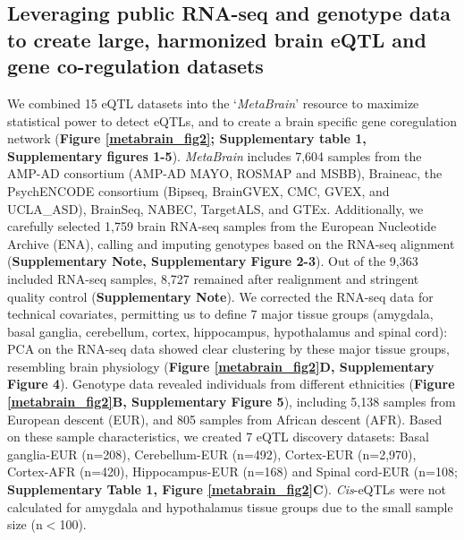 \subsection{Leveraging public RNA-seq and genotype data to create large, harmonized brain eQTL and gene co-regulation datasets}
We combined 15 eQTL datasets into the ‘\textit{MetaBrain}’ resource to maximize statistical power to detect eQTLs, and to create a brain specific gene coregulation network (\textbf{Figure \ref{metabrain_fig2}; Supplementary table 1, Supplementary figures 1-5}). \textit{MetaBrain} includes 7,604 samples from the AMP-AD consortium\cite{hodesAcceleratingMedicinesPartnership2016} (AMP-AD MAYO\cite{hodesAcceleratingMedicinesPartnership2016}, ROSMAP\cite{hodesAcceleratingMedicinesPartnership2016} and MSBB\cite{hodesAcceleratingMedicinesPartnership2016}), Braineac\cite{ramasamyGeneticVariabilityRegulation2014}, the PsychENCODE consortium\cite{consortium*RevealingBrainMolecular2018} (Bipseq\cite{wangComprehensiveFunctionalGenomic2018}, BrainGVEX\cite{wangComprehensiveFunctionalGenomic2018}, CMC\cite{fromerGeneExpressionElucidates2016}, GVEX, and UCLA\_ASD\cite{wangComprehensiveFunctionalGenomic2018}), BrainSeq\cite{brainseq2015}, NABEC\cite{gibbsAbundantQuantitativeTrait2010}, TargetALS\cite{prudencioDistinctBrainTranscriptome2015}, and GTEx\cite{donovanCellularDeconvolutionGTEx2020}. Additionally, we carefully selected 1,759 brain RNA-seq samples from the European Nucleotide Archive (ENA)\cite{leinonenEuropeanNucleotideArchive2011}, calling and imputing genotypes based on the RNA-seq alignment (\textbf{Supplementary Note, Supplementary Figure 2-3}). Out of the 9,363 included RNA-seq samples, 8,727 remained after realignment and stringent quality control (\textbf{Supplementary Note}). We corrected the RNA-seq data for technical covariates, permitting us to define 7 major tissue groups (amygdala, basal ganglia, cerebellum, cortex, hippocampus, hypothalamus and spinal cord): PCA on the RNA-seq data showed clear clustering by these major tissue groups, resembling brain physiology (\textbf{Figure \ref{metabrain_fig2}D, Supplementary Figure 4}). Genotype data revealed individuals from different ethnicities (\textbf{Figure \ref{metabrain_fig2}B, Supplementary Figure 5}), including 5,138 samples from European descent (EUR), and 805 samples from African descent (AFR). Based on these sample characteristics, we created 7 eQTL discovery datasets: Basal ganglia-EUR (n=208), Cerebellum-EUR (n=492), Cortex-EUR (n=2,970), Cortex-AFR (n=420), Hippocampus-EUR (n=168) and Spinal cord-EUR (n=108; \textbf{Supplementary Table 1, Figure \ref{metabrain_fig2}C}). \emph{Cis}-eQTLs were not calculated for amygdala and hypothalamus tissue groups due to the small sample size (n$<$100). 

